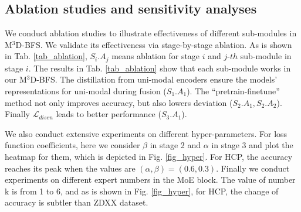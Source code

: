 \documentclass[10pt,twocolumn,letterpaper]{article}
\begin{document}
\subsection{Ablation studies and sensitivity analyses}
We conduct ablation studies to illustrate effectiveness of different sub-modules in M$^3$D-BFS. 
We validate its effectiveness via stage-by-stage ablation. As is shown in Tab. \ref{tab_ablation}, $S_i.A_j$ means ablation for stage $i$ and $j\mbox{-}th$ sub-module in stage $i$. The results in Tab. \ref{tab_ablation} show that each sub-module works in our M$^3$D-BFS. The distillation from uni-modal encoders ensure the models' representations for uni-modal during fusion ($S_1.A_1$). The ``pretrain-finetune'' method not only improves accuracy, but also lowers deviation ($S_2.A_1, S_2.A_2$). Finally $\mathcal{L}_{disen}$ leads to better performance ($S_3.A_1$). 

We also conduct extensive experiments on different hyper-parameters. 
For loss function coefficients, here we consider $\beta$ in stage 2 and $\alpha$ in stage 3 and plot the heatmap for them, which is depicted in Fig. \ref{fig_hyper}. For HCP, the accuracy reaches its peak when the values are $(\alpha, \beta) = (0.6, 0.3)$.
Finally we conduct experiments on different expert numbers in the MoE block. The value of number k is from 1 to 6, and as is shown in Fig. \ref{fig_hyper}, for HCP, the change of accuracy is subtler than ZDXX dataset.

\end{document}
